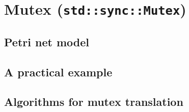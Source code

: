 \section{Mutex (\texttt{std::sync::Mutex})}

\subsection{Petri net model}

\subsection{A practical example}

\subsection{Algorithms for mutex translation}
\label{sec:mutex-algorithms}